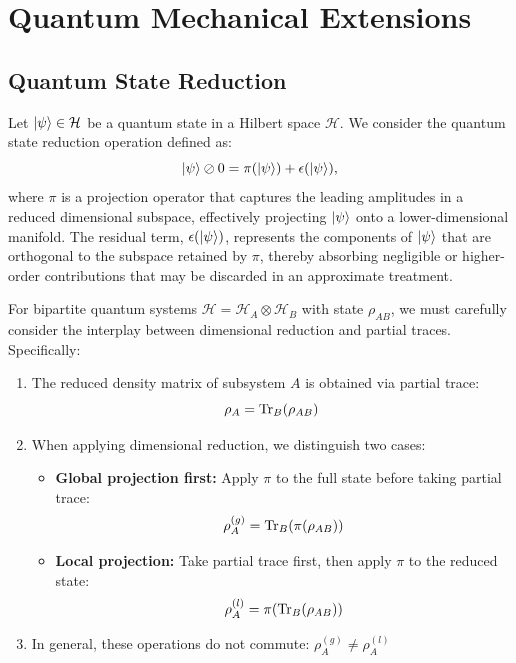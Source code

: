 \documentclass[sn-mathphys-num]{sn-jnl}
\theoremstyle{thmstyleone}
\theoremstyle{thmstyletwo}
\theoremstyle{thmstylethree}
\begin{document}
\section{Quantum Mechanical Extensions}

\subsection{Quantum State Reduction}
Let $\ket{\psi} \in \mathcal{H}$ be a quantum state in a Hilbert space $\mathcal{H}$. We consider the quantum state reduction operation defined as:
\[
\ket{\psi} \oslash 0 = \pi(\ket{\psi}) + \epsilon(\ket{\psi}),
\]
where $\pi$ is a projection operator that captures the leading amplitudes in a reduced dimensional subspace, effectively projecting $\ket{\psi}$ onto a lower-dimensional manifold. The residual term, $\epsilon(\ket{\psi})$, represents the components of $\ket{\psi}$ that are orthogonal to the subspace retained by $\pi$, thereby absorbing negligible or higher-order contributions that may be discarded in an approximate treatment.

For bipartite quantum systems $\mathcal{H} = \mathcal{H}_A \otimes \mathcal{H}_B$ with state $\rho_{AB}$, we must carefully consider the interplay between dimensional reduction and partial traces. Specifically:

\begin{enumerate}
    \item The reduced density matrix of subsystem $A$ is obtained via partial trace:
        \[
        \rho_A = \Tr_B(\rho_{AB})
        \]
    
    \item When applying dimensional reduction, we distinguish two cases:
        \begin{itemize}
            \item \textbf{Global projection first:} Apply $\pi$ to the full state before taking partial trace:
                \[
                \rho_A^{(g)} = \Tr_B(\pi(\rho_{AB}))
                \]
            \item \textbf{Local projection:} Take partial trace first, then apply $\pi$ to the reduced state:
                \[
                \rho_A^{(l)} = \pi(\Tr_B(\rho_{AB}))
                \]
        \end{itemize}
        
    \item In general, these operations do not commute: $\rho_A^{(g)} \neq \rho_A^{(l)}$
\end{enumerate}
\end{document}
